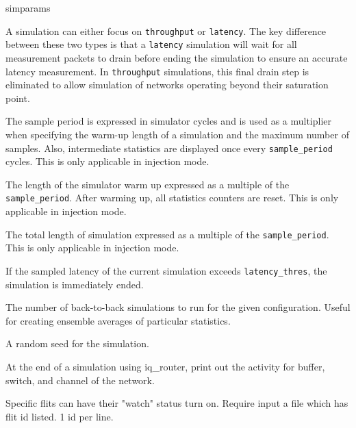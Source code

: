 \documentclass[11pt]{article}
\begin{document}
\begin{opt_list}{simparams}

\item[sim\_type] A simulation can either focus on
\texttt{throughput} or \texttt{latency}.  The key difference between
these two types is that a \texttt{latency} simulation will wait for
all measurement packets to drain before ending the simulation to
ensure an accurate latency measurement.  In \texttt{throughput}
simulations, this final drain step is eliminated to allow simulation
of networks operating beyond their saturation point.

\item[sample\_period] The sample period is expressed in simulator
cycles and is used as a multiplier when specifying the warm-up length
of a simulation and the maximum number of samples.  Also, intermediate
statistics are displayed once every \texttt{sample\_period} cycles. This is only applicable in injection mode.

\item[warmup\_periods] The length of the simulator warm up expressed
as a multiple of the \texttt{sample\_period}.  After warming up, all
statistics counters are reset. This is only applicable in injection mode.

\item[max\_samples] The total length of simulation expressed as a
multiple of the \texttt{sample\_period}. This is only applicable in injection mode.

\item[latency\_thres] If the sampled latency of the current simulation
exceeds \texttt{latency\_thres}, the simulation is immediately ended.

\item[sim\_count] The number of back-to-back simulations to run for the
given configuration.  Useful for creating ensemble averages of
particular statistics.

\item[seed] A random seed for the simulation.


\item[print\_activity] At the end of a simulation using iq\_router, print out the activity for buffer, switch, and channel of the network. 


\item[watch\_file] Specific flits can have their "watch" status turn on. Require input a file which has flit id listed. 1 id per line. 

\end{opt_list}
\end{document}
